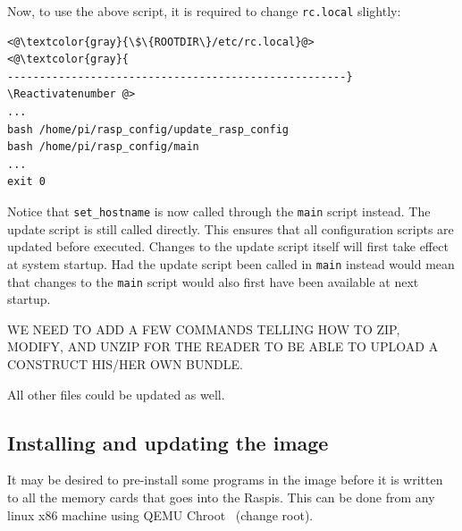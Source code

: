 Now, to use the above script, it is required to change \texttt{rc.local}
slightly:
\Suppressnumber\begin{lstlisting}[]
<@\textcolor{gray}{\$\{ROOTDIR\}/etc/rc.local}@>
<@\textcolor{gray}{
-----------------------------------------------------}
\Reactivatenumber @>
...
bash /home/pi/rasp_config/update_rasp_config
bash /home/pi/rasp_config/main
...
exit 0
\end{lstlisting}
\FloatBarrier
\vspace{-5mm}
Notice that \texttt{set\_hostname} is now called through the \texttt{main}
script instead. The update script is still called directly. This ensures that
all configuration scripts are updated before executed. Changes to the update
script itself will first take effect at system startup. Had the update script
been called in \texttt{main} instead would mean that changes to the 
\texttt{main} script would also first have been available at next startup.

%

WE NEED TO ADD A FEW COMMANDS TELLING HOW TO ZIP, MODIFY, AND UNZIP
FOR THE READER TO BE ABLE TO UPLOAD A CONSTRUCT HIS/HER OWN BUNDLE.

All other files could be updated as well.

\subsection{Installing and updating the image}

It may be desired to pre-install some programs in the image before it is
written to all the memory cards that goes into the \ac{Raspi}s.
This can be done from any linux x86 machine using QEMU Chroot~\cite{QemuUserEmulation}
(change root).

